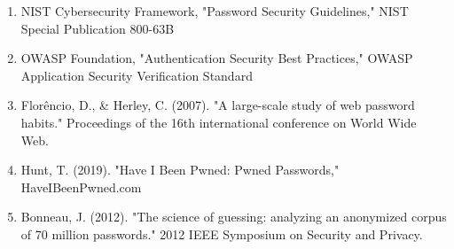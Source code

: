 \documentclass[12pt,a4paper]{article}
\begin{document}
\begin{enumerate}
    \item NIST Cybersecurity Framework, "Password Security Guidelines," NIST Special Publication 800-63B
    \item OWASP Foundation, "Authentication Security Best Practices," OWASP Application Security Verification Standard
    \item Florêncio, D., \& Herley, C. (2007). "A large-scale study of web password habits." Proceedings of the 16th international conference on World Wide Web.
    \item Hunt, T. (2019). "Have I Been Pwned: Pwned Passwords," HaveIBeenPwned.com
    \item Bonneau, J. (2012). "The science of guessing: analyzing an anonymized corpus of 70 million passwords." 2012 IEEE Symposium on Security and Privacy.
\end{enumerate}
\end{document}
